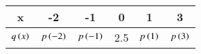 \begin{tabular}{|c|c|c|c|c|c|}
    \hline
    x & -2&-1&0&1&3\\ \hline
    $q\left(x\right)$&$p\left(-2\right)$&$p\left(-1\right)$&2.5&$p\left(1\right)$&$p\left(3\right)$\\ \hline
\end{tabular}